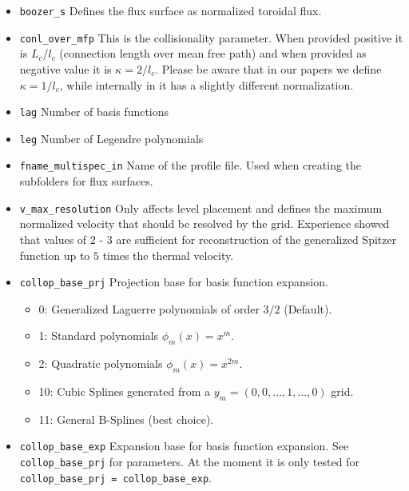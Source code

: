\documentclass{article}
\newcommand{\vv}[1]{\texttt{\detokenize{#1}}}
\begin{document}
\begin{itemize}
 \item \verb|boozer_s| \newline
 Defines the flux surface as normalized toroidal flux.
 \item \verb|conl_over_mfp|\newline
 This is the collisionality parameter. When provided positive it is
 $L_c/l_c$ (connection length over mean free path) and when provided as
 negative value it is $\kappa = 2/l_c$. Please be aware that in our
 papers we define $\kappa = 1/l_c$, while internally in \vv{NEO-2} it has a
 slightly different normalization.
 \item \verb|lag|\newline
 Number of basis functions
 \item \verb|leg|\newline
 Number of Legendre polynomials
 \item \verb|fname_multispec_in|
 Name of the profile file. Used when creating the subfolders for flux
 surfaces.
 \item \verb|v_max_resolution|\newline
 Only affects level placement and defines the maximum normalized
 velocity that should be resolved by the grid. Experience showed that
 values of $2$ - $3$ are sufficient for reconstruction of the
 generalized Spitzer function up to $5$ times the thermal velocity.
 \item \verb|collop_base_prj|\newline
 Projection base for basis function expansion.
 \begin{itemize}
  \item 0: Generalized Laguerre polynomials of order $3/2$ (Default).
  \item 1: Standard polynomials $\phi_m(x) = x^m$.
  \item 2: Quadratic polynomials $\phi_m(x) = x^{2m}$.
  \item 10: Cubic Splines generated from a $y_m = (0, 0, ..., 1, ..., 0)$ grid.
  \item 11: General B-Splines (best choice).
 \end{itemize}

 \item \verb|collop_base_exp|\newline
 Expansion base for basis function expansion. See \verb|collop_base_prj|
 for parameters. At the moment it is only tested for
 \verb|collop_base_prj = collop_base_exp|.


\end{itemize}
\end{document}
